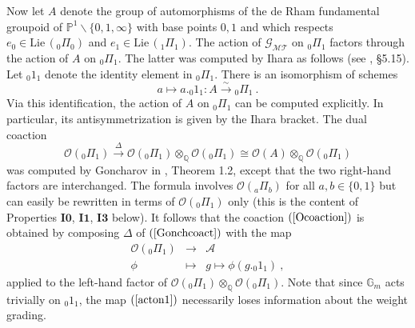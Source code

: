 \documentclass[10pt]{amsart}
\theoremstyle{definition}
\theoremstyle{remark}
\numberwithin{equation}{section}
\newcommand{\Pro}{\mathbb P}
\newcommand{\GMT}{\mathcal{G_{MT}}}
\newcommand{\G}{\mathbb{G}}
\newcommand{\Ao}{\mathcal{A}}
\newcommand{\tp}{{}_0 1_{1}}
\newcommand{\pio}{{}_0 \Pi_{1}}
\newcommand{\Io}{\mathbf{I0}}
\newcommand{\Ii}{\mathbf{I1}}
\newcommand{\Iiii}{\mathbf{I3}}
\newcommand{\Q}{\mathbb Q}
\newcommand{\To}{\longrightarrow}
\begin{document}
  
  Now let $A$ denote the group of automorphisms of the de Rham fundamental groupoid of $\Pro^1 \backslash \{0,1,\infty\}$ with base points $0,1$ and which respects $e_0\in \mathrm{Lie}\, ({}_0 \Pi_{0})$ and  $e_1\in \mathrm{Lie}\, ({}_1 \Pi_{1})$.  The action of $\GMT$ on $\pio$ factors through the action of  $A$ on $\pio$. The latter was computed by Ihara as follows (see \cite{DG}, \S5.15). Let   $ \tp$ denote the identity element in  $\pio$.   There is an isomorphism of schemes
 \begin{equation} a\mapsto a .\tp: A \overset{\sim}{\To} \pio \ . 
 \end{equation}    
 Via this identification, the action of $A$ on $\pio$ can be computed explicitly. In particular, its antisymmetrization is  given by the Ihara bracket. The dual coaction
  \begin{equation} \label{Gonchcoact}
\mathcal{O}(\pio) \overset{\Delta}{\To} \mathcal{O}(\pio) \otimes_{\Q} \mathcal{O}(\pio) \cong \mathcal{O}(A) \otimes_{\Q} \mathcal{O}(\pio)
  \end{equation} 
  was computed  by Goncharov in \cite{GG}, Theorem 1.2, except that the two right-hand factors are interchanged. The formula involves $\mathcal{O}( {}_a \Pi_b)$ for
  all $a,b\in \{0,1\}$ but can easily be rewritten in terms of  $ \mathcal{O}(\pio)$ only (this is the content of Properties $\Io$, $\Ii$, $\Iiii$   below). It follows that the coaction 
  $(\ref{Ocoaction})$ is obtained  by composing $\Delta$ of $(\ref{Gonchcoact})$ with the map
  \begin{eqnarray} \label{acton1}
  \mathcal{O}(\pio) & \To&  \Ao \\
\phi & \mapsto &  g \mapsto \phi(g. \tp) \ , \nonumber 
  \end{eqnarray}
applied to the left-hand factor of  $  \mathcal{O}(\pio) \otimes_{\Q}   \mathcal{O}(\pio)$. Note that since $\G_m$ acts trivially on $\tp$, the map $(\ref{acton1})$ necessarily loses information about the weight grading.
\end{document}
